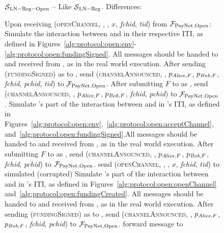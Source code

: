 \begin{figure}[!htbp]
  \begin{simulatorbox}{$\mathcal{S}{}_{\mathrm{LN - Reg - Open}}$ --
  }
    Like $\mathcal{S}{}_{\mathrm{LN - Reg}}$. Differences:
    \begin{algorithmic}[1]
      \State Upon receiving (\textsc{openChannel}, \alice, \bob, $x$,
      \textit{fchid}, \textit{tid}) from $\mathcal{F}_{\mathrm{PayNet}}{}_{\mathrm{, Open}}$:
      \Indent
          \State Simulate the interaction between \alice{} and \bob{} in their
          respective ITI, as defined in
          Figures~\ref{alg:protocol:open:env}-\ref{alg:protocol:open:fundingSigned}.
          All messages should be handed to and received from \adversary, as in
          the real world execution.
          \State After sending (\textsc{fundingSigned}) as \bob{} to \alice,
          send (\textsc{channelAnnounced}, \bob, $p_{\mathit{Alice}, F}$, $p_{\mathit{Bob}, F}$,
          \textit{fchid}, \textit{pchid}, \textit{tid}) to
          $\mathcal{F}_{\mathrm{PayNet}}{}_{\mathrm{, Open}}$.
          \label{alg:sim:open:announced:bob:bothhonest}
          \State After submitting $F$ to \ledger{} as \alice, send
          (\textsc{channelAnnounced}, \alice, $p_{\mathit{Alice}, F}$, $p_{\mathit{Bob}, F}$,
          \textit{fchid}, \textit{pchid}) to $\mathcal{F}_{\mathrm{PayNet}}{}_{\mathrm{, Open}}$.
          \label{alg:sim:open:announced:alice:bothhonest}
          \State Simulate \alice's part of the interaction between \alice{}
          and \bob{} in \alice's ITI, as defined in
          Figures~\ref{alg:protocol:open:env},~\ref{alg:protocol:open:acceptChannel},
          and~\ref{alg:protocol:open:fundingSigned}.All messages should be
          handed to and received from \adversary, as in the real world
          execution.
          \State After submitting $F$ to \ledger{} as \alice, send
          (\textsc{channelAnnounced}, \alice, $p_{\mathit{Alice}, F}$, $p_{\mathit{Bob}, F}$,
          \textit{fchid}, \textit{pchid}) to $\mathcal{F}_{\mathrm{PayNet}}{}_{\mathrm{, Open}}$.
          \label{alg:sim:open:announced:alice:alicehonest}
          \State send (\textsc{openChannel}, \alice, \bob, $x$,
          \textit{fchid}, \textit{tid}) to simulated (corrupted) \alice
          \State Simulate \bob's part of the interaction between \alice{}
          and \bob{} in \bob's ITI, as defined in
          Figures~\ref{alg:protocol:open:openChannel}
          and~\ref{alg:protocol:open:fundingCreated}.
          All messages should be handed to and received from \adversary, as in
          the real world execution.
          \State After sending (\textsc{fundingSigned}) as \bob{} to \alice,
          send (\textsc{channelAnnounced}, \bob, $p_{\mathit{Alice}, F}$, $p_{\mathit{Bob}, F}$,
          \textit{fchid}, \textit{pchid}) to $\mathcal{F}_{\mathrm{PayNet}}{}_{\mathrm{, Open}}$.
          \label{alg:sim:open:announced:bob:bobhonest}
          \State forward message to \adversary{} 
        \EndIf
      \EndIndent
      \Statex


\end{algorithmic}
\end{simulatorbox}
\end{figure}
